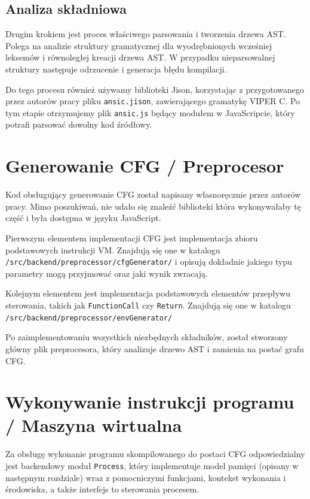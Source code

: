 \documentclass[a4paper,twoside,openright,11pt]{report}
\begin{document}
  \subsection {Analiza składniowa}
\par Drugim krokiem jest proces właściwego parsowania i tworzenia drzewa AST. Polega na analizie struktury gramatycznej dla wyodrębnionych wcześniej leksemów i równoległej kreacji drzewa AST. W przypadku nieparsowalnej struktury następuje odrzucenie i generacja błędu kompilacji. \cite{ansk} 
\par Do tego procesu również używamy biblioteki Jison, korzystając z przygotowanego przez autorów pracy pliku \texttt{ansic.jison}, zawierającego gramatykę VIPER C. Po tym etapie otrzymujemy plik \texttt{ansic.js} będący modułem w JavaScripcie, który potrafi parsować dowolny kod źródłowy.

  \section {Generowanie CFG / Preprocesor}
	\par Kod obsługujący generowanie CFG został napisany własnoręcznie przez autorów pracy. Mimo poszukiwań, nie udało się znaleźć biblioteki która wykonywałaby tę część i była dostępna w języku JavaScript.
	\par Pierwszym elementem implementacji CFG jest implementacja zbioru podstawowych instrukcji VM. Znajdują się one w katalogu \texttt{/src/backend/preprocessor/cfgGenerator/} i opisują dokładnie jakiego typu parametry mogą przyjmować oraz jaki wynik zwracają. 
	\par Kolejnym elementem jest implementacja podstawowych elementów przepływu sterowania, takich jak \texttt{FunctionCall} czy \texttt{Return}. Znajdują się one w katalogu \texttt{/src/backend/preprocessor/envGenerator/}
	\par Po zaimplementowaniu wszystkich niezbędnych składników, został stworzony główny plik preprocesora, który analizuje drzewo AST i zamienia na postać grafu CFG.
	  
  \section {Wykonywanie instrukcji programu / Maszyna wirtualna}
 	\par Za obsługę wykonanie programu skompilowanego do postaci CFG odpowiedzialny jest backendowy moduł \texttt{Process}, który implementuje model pamięci (opisany w następnym rozdziale) wraz z pomocniczymi funkcjami, kontekst wykonania i środowiska, a także interfejs to sterowania procesem.
\end{document}
